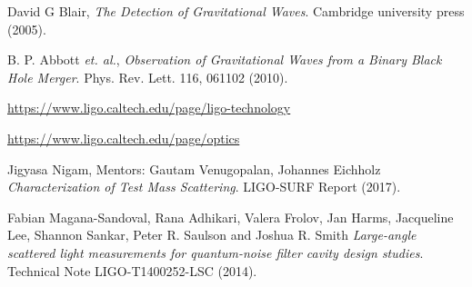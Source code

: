 \documentclass[colorlinks=true,pdfstartview=FitV,linkcolor=blue,
            citecolor=red,urlcolor=magenta]{ligodoc}
\begin{document}
\begin{thebibliography}{9}
      
	  David G Blair,
	  \emph{The Detection of Gravitational Waves}.
	 Cambridge university press (2005).  
	 
	  B. P. Abbott \textit{et. al.},
	  \emph{Observation of Gravitational Waves from a Binary Black Hole Merger}.
	 Phys. Rev. Lett. 116, 061102 (2010). 
	 
       \url{https://www.ligo.caltech.edu/page/ligo-technology}
       
     \url{https://www.ligo.caltech.edu/page/optics}
      
	  Jigyasa Nigam, Mentors: Gautam Venugopalan, Johannes Eichholz
	  \emph{Characterization of Test Mass Scattering}.
	 LIGO-SURF Report (2017).  
	 
	  Fabian Magana-Sandoval, Rana Adhikari, Valera Frolov, Jan Harms, Jacqueline Lee, Shannon Sankar, Peter R. Saulson and Joshua R. Smith
	  \emph{Large-angle scattered light measurements for quantum-noise filter cavity design studies}.
	 Technical Note LIGO-T1400252-LSC (2014).
	 
 
\end{thebibliography} %
\end{document}
